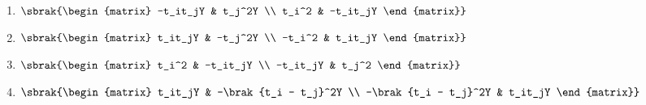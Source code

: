 \begin{figure}[!ht]
\centering
\resizebox{0.7\textwidth}{!}{%

}%
\end{figure}
\begin{enumerate}
    \item $\sbrak{\begin{matrix}
        -t_it_jY & t_j^2Y \\ t_i^2 & -t_it_jY
    \end{matrix}}$
     \item $\sbrak{\begin{matrix}
        t_it_jY & -t_j^2Y \\ -t_i^2 & t_it_jY
    \end{matrix}}$
     \item $\sbrak{\begin{matrix}
        t_i^2 & -t_it_jY \\ -t_it_jY & t_j^2
    \end{matrix}}$
     \item $\sbrak{\begin{matrix}
        t_it_jY & -\brak{t_i - t_j}^2Y \\ -\brak{t_i - t_j}^2Y & t_it_jY
    \end{matrix}}$
     \end{enumerate}
